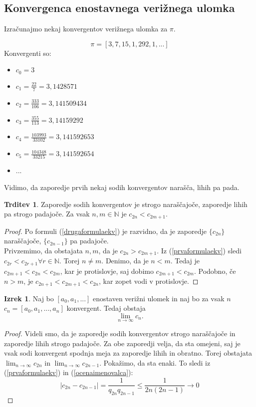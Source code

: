\documentclass[a4paper,12pt]{article}
\newcommand{\N}{\mathbb{N}}
\theoremstyle{definition}
\theoremstyle{proposition}
\newtheorem{trd}{Trditev}[section]
\theoremstyle{theorem}
\newtheorem{iz}{Izrek}[section]
\theoremstyle{lemma}
\begin{document}
\subsection{Konvergenca enostavnega verižnega ulomka} \label{konvca}

Izračunajmo nekaj konvergentov verižnega ulomka za $\pi$.

\[ \pi = [3, 7, 15, 1, 292, 1, ...] \]
Konvergenti so:
	\begin{itemize}
	\item $c_0 = 3$
	\item $c_1 = \frac{22}{7} = 3,1428571$
	\item $c_2 = \frac{333}{106} = 3,141509434$
	\item $c_3 = \frac{355}{113} = 3,14159292$
	\item $c_4 = \frac{103993}{33102} = 3,141592653$
	\item $c_5 = \frac{104348}{33215} = 3,141592654$
	\item ...
	\end{itemize}
	
Vidimo, da zaporedje prvih nekaj sodih konvergentov narašča, lihih pa pada.

\begin{trd}
\label{podzaporedji}
Zaporedje sodih konvergentov je strogo naraščajoče, zaporedje lihih pa strogo padajoče. Za vsak $n, m \in \N$ je  $c_{2n} < c_{2m+1}$.
\end{trd}
\begin{proof}
Po formuli (\ref{drugaformulaekv}) je razvidno, da je zaporedje $\{c_{2n}\}$ naraščajoče, $\{c_{2n-1}\}$ pa padajoče. \\
Privzemimo, da obstajata $n, m$, da je $c_{2n} > c_{2m+1}$. Iz (\ref{prvaformulaekv}) sledi $c_{2r} < c_{2r+1} \forall r \in \N$. Torej $ n \neq m$. Denimo, da je $n < m$. Tedaj je $c_{2m+1} < c_{2n} < c_{2m}$, kar je protislovje, saj dobimo $c_{2m+1} < c_{2m}$. Podobno, če $n > m$, je $c_{2n+1} < c_{2m+1} < c_{2n}$, kar zopet vodi v protislovje.
\end{proof}

\begin{iz}
\label{konvergenca}
Naj bo $[a_0, a_1, ...]$ enostaven verižni ulomek in naj bo za vsak $n$ $c_n = [a_0, a_1, ..., a_n]$ konvergent. Tedaj obstaja $$\lim_{n\to\infty}c_n.$$
\end{iz}

\begin{proof}
Videli smo, da je zaporedje sodih konvergentov strogo naraščajoče in zaporedje lihih strogo padajoče. Za obe zaporedji velja, da sta omejeni, saj je vsak sodi konvergent spodnja meja za zaporedje lihih in obratno. Torej obstajata $\lim_{n\to\infty}c_{2n}$ in $\lim_{n\to\infty}c_{2n-1}$. Pokažimo, da sta enaki. To sledi iz (\ref{prvaformulaekv}) in (\ref{ocenaimenovalca}):
\[ \left|c_{2n} - c_{2n-1}\right| = \frac{1}{q_{2n} q_{2n-1}} \leq \frac{1}{2n(2n-1)} \longrightarrow 0 \]
\end{proof}
\end{document}
